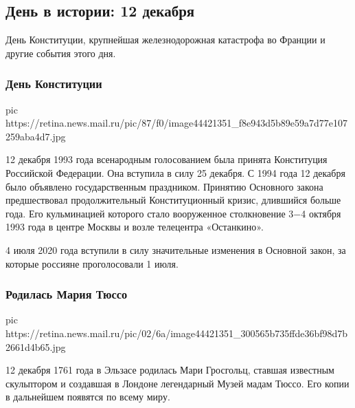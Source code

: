  
 
 
 
 
 
\subsection{День в истории: 12 декабря}
\label{sec:12_12_2020.news.ru.mail_ru.1.den_v_istorii}

День Конституции, крупнейшая железнодорожная катастрофа во Франции и другие
события этого дня.

\subsubsection{День Конституции}

\ifcmt
pic https://retina.news.mail.ru/pic/87/f0/image44421351_f8e943d5b89e59a7d77e107259aba4d7.jpg
\fi

12 декабря 1993 года всенародным голосованием была принята Конституция
Российской Федерации. Она вступила в силу 25 декабря. С 1994 года 12 декабря
было объявлено государственным праздником. Принятию Основного закона
предшествовал продолжительный Конституционный кризис, длившийся больше года.
Его кульминацией которого стало вооруженное столкновение 3−4 октября 1993 года
в центре Москвы и возле телецентра «Останкино».

4 июля 2020 года вступили в силу значительные изменения в Основной закон, за
которые россияне проголосовали 1 июля.

\subsubsection{Родилась Мария Тюссо}

\ifcmt
pic https://retina.news.mail.ru/pic/02/6a/image44421351_300565b735ffde36bf98d7b2661d4b65.jpg
\fi


12 декабря 1761 года в Эльзасе родилась Мари Гросгольц, ставшая известным
скульптором и создавшая в Лондоне легендарный Музей мадам Тюссо. Его копии в
дальнейшем появятся по всему миру.


